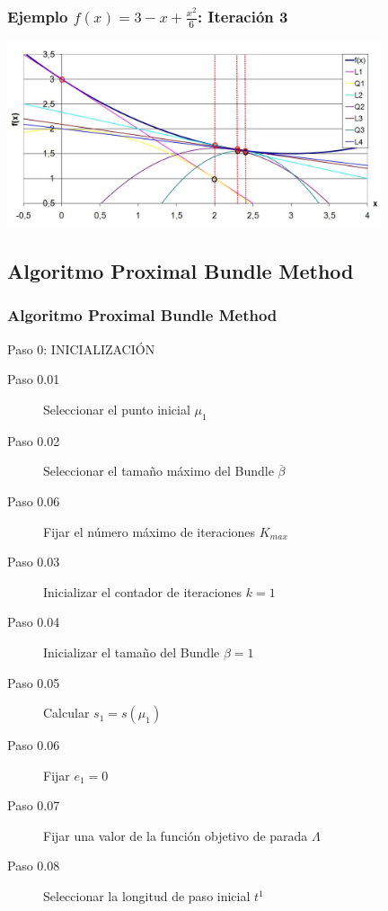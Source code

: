 \documentclass[xcolor=dvipsnames, utf8, spanish]{beamer} %
\begin{document}
\begin{frame}
	\frametitle{Ejemplo $f(x)=3-x+\frac{x^2}{6}$: Iteración 3}
	\begin{center}
		\includegraphics[width=11cm]{figuras/ejemplo07.JPG}
	\end{center}
\end{frame}


\subsection{Algoritmo Proximal Bundle Method}

\begin{frame}
	\frametitle{Algoritmo Proximal Bundle Method}
	\begingroup
		\begin{block} {Paso 0: INICIALIZACIÓN}
			\begin{description}
				\item [Paso 0.01] Seleccionar el punto inicial $\mu_1$
				\item [Paso 0.02] Seleccionar el tamaño máximo del Bundle $\overline{\beta}$
				\item [Paso 0.06] Fijar el número máximo de iteraciones $K_{max}$
				\item [Paso 0.03] Inicializar el contador de iteraciones $k = 1$
				\item [Paso 0.04] Inicializar el tamaño del Bundle $\beta = 1$
				\item [Paso 0.05] Calcular $s_1 = s(\mu_1)$
				\item [Paso 0.06] Fijar $e_1 = 0$
				\item [Paso 0.07] Fijar una valor de la función objetivo de parada $\Lambda$
				\item [Paso 0.08] Seleccionar la longitud de paso inicial $t^1$
			\end{description}
		\end{block}
	\endgroup
\end{frame}
\end{document}
